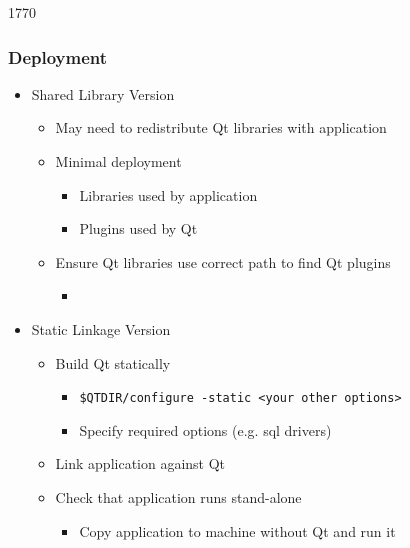 \begin{slide}{1770}
  \frametitle{Deployment}
  \begin{itemize}
  \item Shared Library Version
    \begin{itemize}
    \item May need to redistribute Qt libraries with application
    \item Minimal deployment
      \begin{itemize}
      \item Libraries used by application
      \item Plugins used by Qt
      \end{itemize}
    \item Ensure Qt libraries use correct path to find Qt plugins
      \begin{itemize}
      \item[] 
      \end{itemize}
   \end{itemize}
  \item Static Linkage Version
    \begin{itemize}
    \item Build Qt statically
      \begin{itemize}
      \item \texttt{\$QTDIR/configure -static <your other options>}
      \item Specify required options (e.g. sql drivers)
      \end{itemize}
    \item Link application against Qt
    \item Check that application runs stand-alone
      \begin{itemize}
      \item Copy application to machine without Qt and run it
      \end{itemize}
    \end{itemize}
  \end{itemize}

\end{slide}
